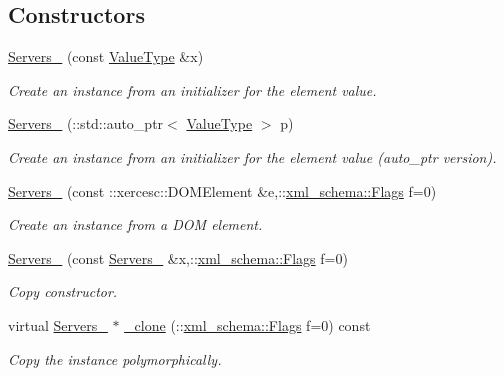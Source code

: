 \subsection*{Constructors}
\begin{DoxyCompactItemize}
\item 
\hyperlink{classopenstack_1_1xml_1_1Servers___a5a59d9d0e5bf2e8d75b9962a5da8b2c5}{Servers\_\-} (const \hyperlink{classopenstack_1_1xml_1_1Servers}{ValueType} \&x)
\begin{DoxyCompactList}\small\item\em Create an instance from an initializer for the element value. \item\end{DoxyCompactList}\item 
\hyperlink{classopenstack_1_1xml_1_1Servers___adec00ab78afb2a18b7a141fba3fbc902}{Servers\_\-} (::std::auto\_\-ptr$<$ \hyperlink{classopenstack_1_1xml_1_1Servers}{ValueType} $>$ p)
\begin{DoxyCompactList}\small\item\em Create an instance from an initializer for the element value (auto\_\-ptr version). \item\end{DoxyCompactList}\item 
\hyperlink{classopenstack_1_1xml_1_1Servers___a028aa7605fe34c57adbd3b43363ce35b}{Servers\_\-} (const ::xercesc::DOMElement \&e,::\hyperlink{namespacexml__schema_affb4c227cbd9aa7453dd1dc5a1401943}{xml\_\-schema::Flags} f=0)
\begin{DoxyCompactList}\small\item\em Create an instance from a DOM element. \item\end{DoxyCompactList}\item 
\hyperlink{classopenstack_1_1xml_1_1Servers___a4ed7e3dce2dbea163b5731e03e8f3cbe}{Servers\_\-} (const \hyperlink{classopenstack_1_1xml_1_1Servers__}{Servers\_\-} \&x,::\hyperlink{namespacexml__schema_affb4c227cbd9aa7453dd1dc5a1401943}{xml\_\-schema::Flags} f=0)
\begin{DoxyCompactList}\small\item\em Copy constructor. \item\end{DoxyCompactList}\item 
virtual \hyperlink{classopenstack_1_1xml_1_1Servers__}{Servers\_\-} $\ast$ \hyperlink{classopenstack_1_1xml_1_1Servers___a2d6110968d57b33db7f8cbd566370369}{\_\-clone} (::\hyperlink{namespacexml__schema_affb4c227cbd9aa7453dd1dc5a1401943}{xml\_\-schema::Flags} f=0) const 
\begin{DoxyCompactList}\small\item\em Copy the instance polymorphically. \item\end{DoxyCompactList}\end{DoxyCompactItemize}
